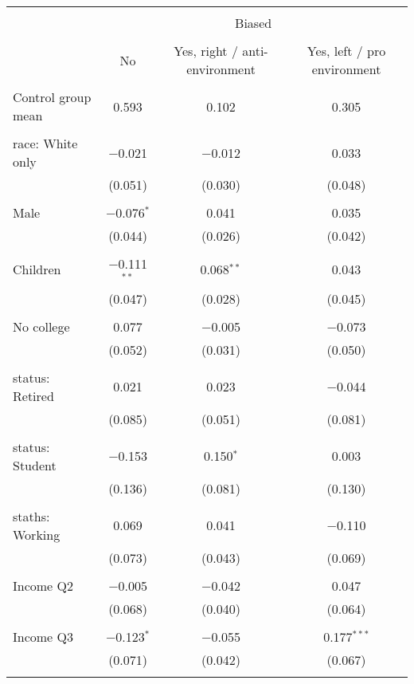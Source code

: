 
\begin{tabular}{@{\extracolsep{5pt}}lccc} 
\\[-1.8ex]\hline 
\hline \\[-1.8ex] 
 & \multicolumn{3}{c}{Biased} \\ 
\cline{2-4} 
\\[-1.8ex] & No & Yes, right / anti-environment & Yes, left / pro environment \\ 
\hline \\[-1.8ex] 
 Control group mean & 0.593 & 0.102 & 0.305  \\ \hline \\[-1.8ex] race: White only & $-$0.021 & $-$0.012 & 0.033 \\ 
  & (0.051) & (0.030) & (0.048) \\ 
  & & & \\ 
 Male & $-$0.076$^{*}$ & 0.041 & 0.035 \\ 
  & (0.044) & (0.026) & (0.042) \\ 
  & & & \\ 
 Children & $-$0.111$^{**}$ & 0.068$^{**}$ & 0.043 \\ 
  & (0.047) & (0.028) & (0.045) \\ 
  & & & \\ 
 No college & 0.077 & $-$0.005 & $-$0.073 \\ 
  & (0.052) & (0.031) & (0.050) \\ 
  & & & \\ 
 status: Retired & 0.021 & 0.023 & $-$0.044 \\ 
  & (0.085) & (0.051) & (0.081) \\ 
  & & & \\ 
 status: Student & $-$0.153 & 0.150$^{*}$ & 0.003 \\ 
  & (0.136) & (0.081) & (0.130) \\ 
  & & & \\ 
 staths: Working & 0.069 & 0.041 & $-$0.110 \\ 
  & (0.073) & (0.043) & (0.069) \\ 
  & & & \\ 
 Income Q2 & $-$0.005 & $-$0.042 & 0.047 \\ 
  & (0.068) & (0.040) & (0.064) \\ 
  & & & \\ 
 Income Q3 & $-$0.123$^{*}$ & $-$0.055 & 0.177$^{***}$ \\ 
  & (0.071) & (0.042) & (0.067) \\ 
  & & & \\ 

\end{tabular}

